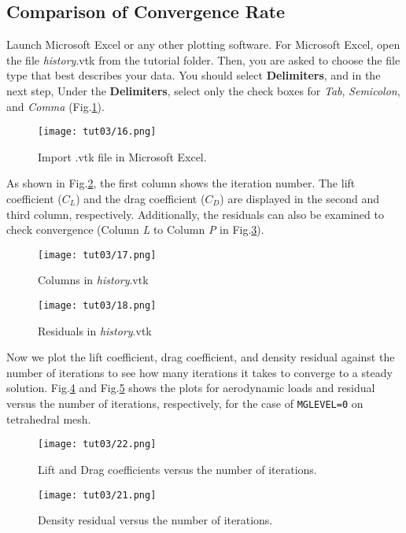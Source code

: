 \subsection{Comparison of Convergence Rate}
Launch Microsoft Excel or any other plotting software. For Microsoft Excel, open the file \textit{history}.vtk from the tutorial folder. Then, you are asked to choose the file type that best describes your data. You should select \textbf{Delimiters}, and in the next step, Under the \textbf{Delimiters}, select only the check boxes for \textit{Tab}, \textit{Semicolon}, and \textit{Comma} (Fig.\ref{fig3:importvtkxlxs}).
\begin{figure}[htbp]
    \centering
    \texttt{[image: tut03/16.png]}
    \caption{Import .vtk file in Microsoft Excel.}
    \label{fig3:importvtkxlxs}
\end{figure}
As shown in Fig.\ref{fig3:columnsxlxs}, the first column shows the iteration number. The lift coefficient ($C_L$) and the drag coefficient ($C_D$) are displayed in the second and third column, respectively. Additionally, the residuals can also be examined to check convergence (Column \textit{L} to Column \textit{P} in Fig.\ref{fig3:residualxlxs}).
\begin{figure}[htbp]
    \centering
    \texttt{[image: tut03/17.png]}
    \caption{Columns in \textit{history}.vtk}
    \label{fig3:columnsxlxs}
\end{figure}
\begin{figure}[htbp]
    \centering
    \texttt{[image: tut03/18.png]}
    \caption{Residuals in \textit{history}.vtk}
    \label{fig3:residualxlxs}
\end{figure}
Now we plot the lift coefficient, drag coefficient, and density residual against the number of iterations to see how many iterations it takes to converge to a steady solution. Fig.\ref{fig3:clcdxlxs} and Fig.\ref{fig3:res_vs_itr} shows the plots for aerodynamic loads and residual versus the number of iterations, respectively, for the case of \texttt{MGLEVEL=0} on tetrahedral mesh.
\begin{figure}[htbp]
    \centering
    \texttt{[image: tut03/22.png]}
    \caption{Lift and Drag coefficients versus the number of iterations.}
    \label{fig3:clcdxlxs}
\end{figure}
\begin{figure}[htbp]
    \centering
    \texttt{[image: tut03/21.png]}
    \caption{Density residual versus the number of iterations.}
    \label{fig3:res_vs_itr}
\end{figure}
